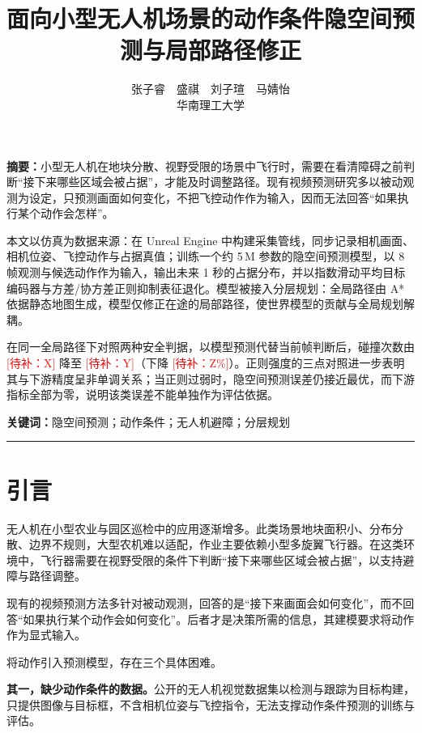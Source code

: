\documentclass[12pt,a4paper]{ctexart}
\date{}
\title{面向小型无人机场景的动作条件隐空间预测与局部路径修正}
\author{张子睿　盛祺　刘子瑄　马婧怡\\[4pt] 华南理工大学}
\date{}
\newcommand{\todo}[1]{\textcolor{red}{[待补：#1]}}
\begin{document}
\pagestyle{plain}
\thispagestyle{empty}

\vspace{8pt}

\begingroup\small
\noindent\textbf{摘要：}小型无人机在地块分散、视野受限的场景中飞行时，需要在看清障碍之前判断``接下来哪些区域会被占据''，才能及时调整路径。现有视频预测研究多以被动观测为设定，只预测画面如何变化，不把飞控动作作为输入，因而无法回答``如果执行某个动作会怎样''。

本文以仿真为数据来源：在 Unreal Engine 中构建采集管线，同步记录相机画面、相机位姿、飞控动作与占据真值；训练一个约 5\,M 参数的隐空间预测模型，以 8 帧观测与候选动作作为输入，输出未来 1 秒的占据分布，并以指数滑动平均目标编码器与方差/协方差正则抑制表征退化。模型被接入分层规划：全局路径由 A* 依据静态地图生成，模型仅修正在途的局部路径，使世界模型的贡献与全局规划解耦。

在同一全局路径下对照两种安全判据，以模型预测代替当前帧判断后，碰撞次数由 \todo{X} 降至 \todo{Y}（下降 \todo{Z\%}）。正则强度的三点对照进一步表明其与下游精度呈非单调关系；当正则过弱时，隐空间预测误差仍接近最优，而下游指标全部为零，说明该类误差不能单独作为评估依据。

\vspace{6pt}
\noindent\textbf{关键词：}隐空间预测；动作条件；无人机避障；分层规划
\endgroup

\vspace{8pt}
\noindent\rule{\textwidth}{0.6pt}
\vspace{12pt}


\section{引言}

无人机在小型农业与园区巡检中的应用逐渐增多。此类场景地块面积小、分布分散、边界不规则，大型农机难以适配，作业主要依赖小型多旋翼飞行器。在这类环境中，飞行器需要在视野受限的条件下判断``接下来哪些区域会被占据''，以支持避障与路径调整。

现有的视频预测方法多针对被动观测，回答的是``接下来画面会如何变化''，而不回答``如果执行某个动作会如何变化''。后者才是决策所需的信息，其建模要求将动作作为显式输入。

将动作引入预测模型，存在三个具体困难。

\textbf{其一，缺少动作条件的数据。}公开的无人机视觉数据集以检测与跟踪为目标构建，只提供图像与目标框，不含相机位姿与飞控指令，无法支撑动作条件预测的训练与评估。
\end{document}
